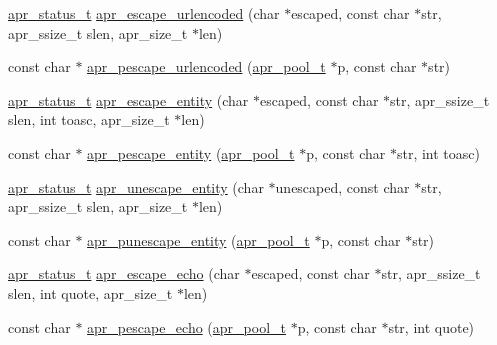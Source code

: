 \begin{DoxyCompactItemize}
\item 
\hyperlink{group__apr__errno_gaf76ee4543247e9fb3f3546203e590a6c}{apr\-\_\-status\-\_\-t} \hyperlink{group___a_p_r___util___escaping_ga0a2cb4e99758afd5bed8fd62df05e16f}{apr\-\_\-escape\-\_\-urlencoded} (char $\ast$escaped, const char $\ast$str, apr\-\_\-ssize\-\_\-t slen, apr\-\_\-size\-\_\-t $\ast$len)
\item 
const char $\ast$ \hyperlink{group___a_p_r___util___escaping_ga9caffb30731e3a07a8e23fa6464d35b5}{apr\-\_\-pescape\-\_\-urlencoded} (\hyperlink{group__apr__pools_gaf137f28edcf9a086cd6bc36c20d7cdfb}{apr\-\_\-pool\-\_\-t} $\ast$p, const char $\ast$str)
\item 
\hyperlink{group__apr__errno_gaf76ee4543247e9fb3f3546203e590a6c}{apr\-\_\-status\-\_\-t} \hyperlink{group___a_p_r___util___escaping_ga6973ca9a596c8fc9fc34eab647cff11c}{apr\-\_\-escape\-\_\-entity} (char $\ast$escaped, const char $\ast$str, apr\-\_\-ssize\-\_\-t slen, int toasc, apr\-\_\-size\-\_\-t $\ast$len)
\item 
const char $\ast$ \hyperlink{group___a_p_r___util___escaping_gad99b0f505645b63b5f552f5d35f174af}{apr\-\_\-pescape\-\_\-entity} (\hyperlink{group__apr__pools_gaf137f28edcf9a086cd6bc36c20d7cdfb}{apr\-\_\-pool\-\_\-t} $\ast$p, const char $\ast$str, int toasc)
\item 
\hyperlink{group__apr__errno_gaf76ee4543247e9fb3f3546203e590a6c}{apr\-\_\-status\-\_\-t} \hyperlink{group___a_p_r___util___escaping_ga9b835b2da5bf35c33f6c69e8e3100c99}{apr\-\_\-unescape\-\_\-entity} (char $\ast$unescaped, const char $\ast$str, apr\-\_\-ssize\-\_\-t slen, apr\-\_\-size\-\_\-t $\ast$len)
\item 
const char $\ast$ \hyperlink{group___a_p_r___util___escaping_gabaaeff6e19e92cf1f138b21e87889e05}{apr\-\_\-punescape\-\_\-entity} (\hyperlink{group__apr__pools_gaf137f28edcf9a086cd6bc36c20d7cdfb}{apr\-\_\-pool\-\_\-t} $\ast$p, const char $\ast$str)
\item 
\hyperlink{group__apr__errno_gaf76ee4543247e9fb3f3546203e590a6c}{apr\-\_\-status\-\_\-t} \hyperlink{group___a_p_r___util___escaping_ga4ebbadaffa33c6aa34e92108c45cd38e}{apr\-\_\-escape\-\_\-echo} (char $\ast$escaped, const char $\ast$str, apr\-\_\-ssize\-\_\-t slen, int quote, apr\-\_\-size\-\_\-t $\ast$len)
\item 
const char $\ast$ \hyperlink{group___a_p_r___util___escaping_ga1265c454e145b9fca52d2feafacd4a02}{apr\-\_\-pescape\-\_\-echo} (\hyperlink{group__apr__pools_gaf137f28edcf9a086cd6bc36c20d7cdfb}{apr\-\_\-pool\-\_\-t} $\ast$p, const char $\ast$str, int quote)

\end{DoxyCompactItemize}
